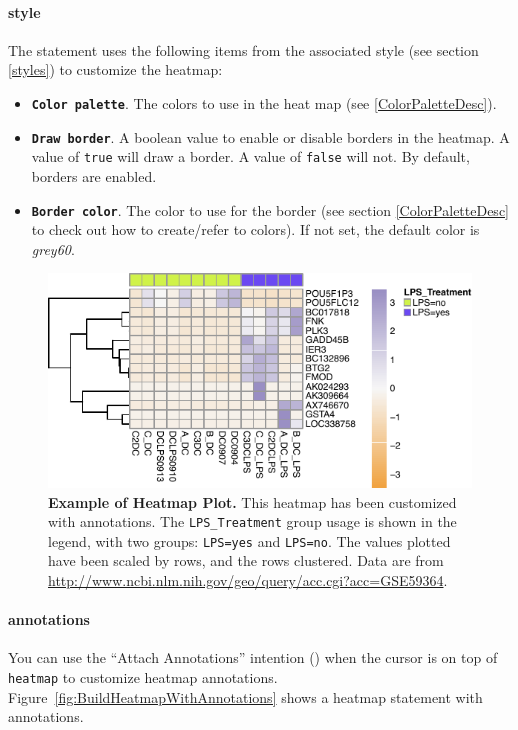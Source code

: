 \paragraph{style}
The statement uses the following items from the associated style (see section \ref{styles}) to customize the heatmap:
\begin{itemize}
\item \textbf{ \texttt{Color palette}}. The colors to use in the heat map (see \ref{ColorPaletteDesc}).
\item \textbf{ \texttt{Draw border}}. A boolean value to enable or disable borders in the heatmap. A value of \texttt{true} will draw a border. A value of \texttt{false} will not. By default, borders are enabled.
\item \textbf{ \texttt{Border color}}. The color to use for the border (see section \ref{ColorPaletteDesc} to check out how to create/refer to colors). If not set, the default color is \emph{grey60}.
\end{itemize}
\begin{figure}[h!tbp]
  \centering
  \includegraphics[width=\figWidthWide]{figures/heatmap_Example.pdf}
\caption[Example of Heatmap Plot.]{\textbf{Example of Heatmap Plot.} This heatmap has been customized with annotations. The \texttt{LPS\_Treatment} group usage is shown in the legend, with two groups: \texttt{LPS=yes} and \texttt{LPS=no}. The values plotted have been scaled by rows, and the rows clustered. Data are from \url{http://www.ncbi.nlm.nih.gov/geo/query/acc.cgi?acc=GSE59364}.}
\label{fig:ExampleHeatmapPlot}
\end{figure}
\paragraph{annotations}
You can use the ``Attach Annotations'' intention (\intentionLightBulb) when the cursor is on top of \texttt{heatmap} to customize heatmap annotations. Figure~\ref{fig:BuildHeatmapWithAnnotations} shows a heatmap statement with annotations.

